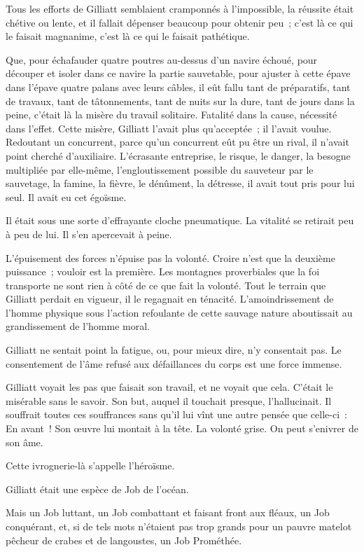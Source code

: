 \documentclass[french,twoside]{book} %
\begin{document}
Tous les efforts de Gilliatt semblaient cramponnés à l’impossible, la réussite était chétive ou lente, et il fallait dépenser beaucoup pour obtenir peu ; c’est là ce qui le faisait magnanime, c’est là ce qui le faisait pathétique.\par
Que, pour échafauder quatre poutres au-dessus d’un navire échoué, pour découper et isoler dans ce navire la partie sauvetable, pour ajuster à cette épave dans l’épave quatre palans avec leurs câbles, il eût fallu tant de préparatifs, tant de travaux, tant de tâtonnements, tant de nuits sur la dure, tant de jours dans la peine, c’était là la misère du travail solitaire. Fatalité dans la cause, nécessité dans l’effet. Cette misère, Gilliatt l’avait plus qu’acceptée ; il l’avait voulue. Redoutant un concurrent, parce qu’un concurrent eût  pu être un rival, il n’avait point cherché d’auxiliaire. L’écrasante entreprise, le risque, le danger, la besogne multipliée par elle-même, l’engloutissement possible du sauveteur par le sauvetage, la famine, la fièvre, le dénûment, la détresse, il avait tout pris pour lui seul. Il avait eu cet égoïsme.\par
Il était sous une sorte d’effrayante cloche pneumatique. La vitalité se retirait peu à peu de lui. Il s’en apercevait à peine.\par
L’épuisement des forces n’épuise pas la volonté. Croire n’est que la deuxième puissance ; vouloir est la première. Les montagnes proverbiales que la foi transporte ne sont rien à côté de ce que fait la volonté. Tout le terrain que Gilliatt perdait en vigueur, il le regagnait en ténacité. L’amoindrissement de l’homme physique sous l’action refoulante de cette sauvage nature aboutissait au grandissement de l’homme moral.\par
Gilliatt ne sentait point la fatigue, ou, pour mieux dire, n’y consentait pas. Le consentement de l’âme refusé aux défaillances du corps est une force immense.\par
Gilliatt voyait les pas que faisait son travail, et ne voyait que cela. C’était le misérable sans le savoir. Son but, auquel il touchait presque, l’hallucinait. Il souffrait toutes ces souffrances sans qu’il lui vînt une autre pensée que celle-ci : En avant ! Son œuvre lui montait à la tête. La volonté grise. On peut s’enivrer de son âme.\par
Cette ivrognerie-là s’appelle l’héroïsme.\par
Gilliatt était une espèce de Job de l’océan.\par
 Mais un Job luttant, un Job combattant et faisant front aux fléaux, un Job conquérant, et, si de tels mots n’étaient pas trop grands pour un pauvre matelot pêcheur de crabes et de langoustes, un Job Prométhée.
\end{document}

